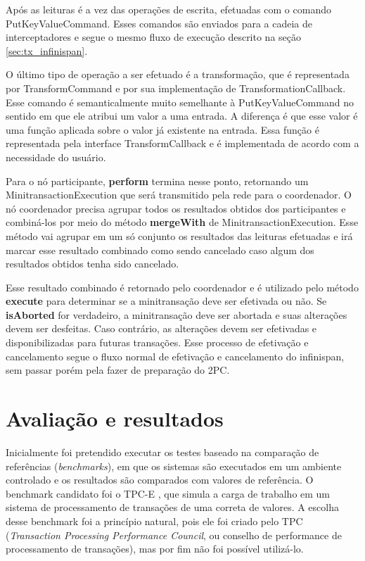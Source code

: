 \documentclass[11pt,twoside,a4paper]{book}
\begin{document}
Após as leituras é a vez das operações de escrita, efetuadas com o comando PutKeyValueCommand. Esses comandos são enviados para a cadeia de interceptadores e segue o mesmo fluxo de execução descrito na seção \ref{sec:tx_infinispan}.

O último tipo de operação a ser efetuado é a transformação, que é representada por TransformCommand e por sua implementação de TransformationCallback. Esse comando é semanticalmente muito semelhante à PutKeyValueCommand no sentido em que ele atribui um valor a uma entrada. A diferença é que esse valor é uma função aplicada sobre o valor já existente na entrada. Essa função é representada pela interface TransformCallback e é implementada de acordo com a necessidade do usuário.

Para o nó participante, \textbf{perform} termina nesse ponto, retornando um MinitransactionExecution que será transmitido pela rede para o coordenador. O nó coordenador precisa agrupar todos os resultados obtidos dos participantes e combiná-los por meio do método \textbf{mergeWith} de MinitransactionExecution. Esse método vai agrupar em um só conjunto os resultados das leituras efetuadas e irá marcar esse resultado combinado como sendo cancelado caso algum dos resultados obtidos tenha sido cancelado.

Esse resultado combinado é retornado pelo coordenador e é utilizado pelo método \textbf{execute} para determinar se a minitransação deve ser efetivada ou não. Se \textbf{isAborted} for verdadeiro, a minitransação deve ser abortada e suas alterações devem ser desfeitas. Caso contrário, as alterações devem ser efetivadas e disponibilizadas para futuras transações. Esse processo de efetivação e cancelamento segue o fluxo normal de efetivação e cancelamento do infinispan, sem passar porém pela fazer de preparação do 2PC.

\chapter{Avaliação e resultados}
\label{cap:resultados}

Inicialmente foi pretendido executar os testes baseado na comparação de referências (\emph{benchmarks}), em que os sistemas são executados em um ambiente controlado e os resultados são comparados com valores de referência. O benchmark candidato foi o TPC-E \cite{tpce}, que simula a carga de trabalho em um sistema de processamento de transações de uma correta de valores. A escolha desse benchmark foi a princípio natural, pois ele foi criado pelo TPC (\emph{Transaction Processing Performance Council}, ou conselho de performance de processamento de transações), mas por fim não foi possível utilizá-lo. 
\end{document}
